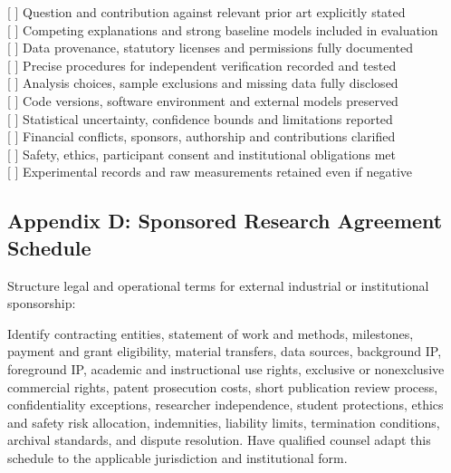 \begin{tcolorbox}[colback=BayesCanvas,colframe=BayesDark,arc=1mm,title=\textbf{Appendix C: Scientific Reproducibility Checklist}]
\scriptsize\ttfamily
{[ ]} Question and contribution against relevant prior art explicitly stated\\
{[ ]} Competing explanations and strong baseline models included in evaluation\\
{[ ]} Data provenance, statutory licenses and permissions fully documented\\
{[ ]} Precise procedures for independent verification recorded and tested\\
{[ ]} Analysis choices, sample exclusions and missing data fully disclosed\\
{[ ]} Code versions, software environment and external models preserved\\
{[ ]} Statistical uncertainty, confidence bounds and limitations reported\\
{[ ]} Financial conflicts, sponsors, authorship and contributions clarified\\
{[ ]} Safety, ethics, participant consent and institutional obligations met\\
{[ ]} Experimental records and raw measurements retained even if negative
\end{tcolorbox}

\subsection{Appendix D: Sponsored Research Agreement Schedule}

Structure legal and operational terms for external industrial or institutional sponsorship:

\begin{tcolorbox}[colback=BayesCanvas,colframe=BayesDark,arc=1mm,title=\textbf{Appendix D: Sponsored Research Agreement Schedule}]
\scriptsize
Identify contracting entities, statement of work and methods, milestones, payment and grant eligibility, material transfers, data sources, background IP, foreground IP, academic and instructional use rights, exclusive or nonexclusive commercial rights, patent prosecution costs, short publication review process, confidentiality exceptions, researcher independence, student protections, ethics and safety risk allocation, indemnities, liability limits, termination conditions, archival standards, and dispute resolution. Have qualified counsel adapt this schedule to the applicable jurisdiction and institutional form.
\end{tcolorbox}

